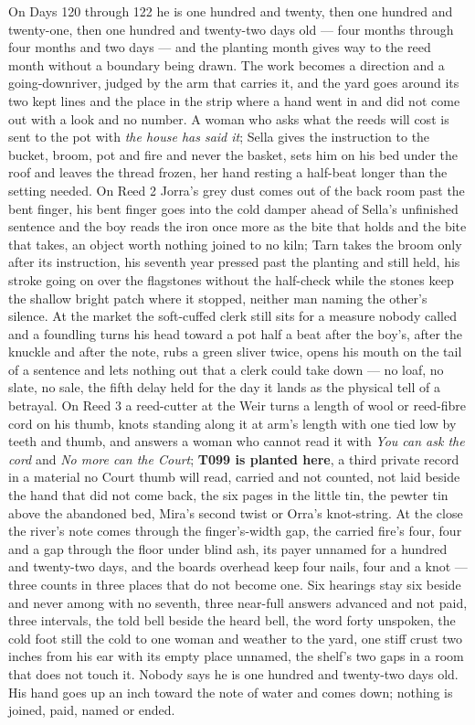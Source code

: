 \documentclass{design/chronicle}
\begin{document}
{On Days 120 through 122 he is one hundred and twenty, then one hundred and twenty-one, then one hundred and twenty-two days old — four months through four months and two days — and the planting month gives way to the reed month without a boundary being drawn. The work becomes a direction and a going-downriver, judged by the arm that carries it, and the yard goes around its two kept lines and the place in the strip where a hand went in and did not come out with a look and no number. A woman who asks what the reeds will cost is sent to the pot with \emph{the house has said it}; Sella gives the instruction to the bucket, broom, pot and fire and never the basket, sets him on his bed under the roof and leaves the thread frozen, her hand resting a half-beat longer than the setting needed. On Reed 2 Jorra’s grey dust comes out of the back room past the bent finger, his bent finger goes into the cold damper ahead of Sella’s unfinished sentence and the boy reads the iron once more as the bite that holds and the bite that takes, an object worth nothing joined to no kiln; Tarn takes the broom only after its instruction, his seventh year pressed past the planting and still held, his stroke going on over the flagstones without the half-check while the stones keep the shallow bright patch where it stopped, neither man naming the other’s silence. At the market the soft-cuffed clerk still sits for a measure nobody called and a foundling turns his head toward a pot half a beat after the boy’s, after the knuckle and after the note, rubs a green sliver twice, opens his mouth on the tail of a sentence and lets nothing out that a clerk could take down — no loaf, no slate, no sale, the fifth delay held for the day it lands as the physical tell of a betrayal. On Reed 3 a reed-cutter at the Weir turns a length of wool or reed-fibre cord on his thumb, knots standing along it at arm’s length with one tied low by teeth and thumb, and answers a woman who cannot read it with \emph{You can ask the cord} and \emph{No more can the Court}; \textbf{T099 is planted here}, a third private record in a material no Court thumb will read, carried and not counted, not laid beside the hand that did not come back, the six pages in the little tin, the pewter tin above the abandoned bed, Mira’s second twist or Orra’s knot-string. At the close the river’s note comes through the finger’s-width gap, the carried fire’s four, four and a gap through the floor under blind ash, its payer unnamed for a hundred and twenty-two days, and the boards overhead keep four nails, four and a knot — three counts in three places that do not become one. Six hearings stay six beside and never among with no seventh, three near-full answers advanced and not paid, three intervals, the told bell beside the heard bell, the word forty unspoken, the cold foot still the cold to one woman and weather to the yard, one stiff crust two inches from his ear with its empty place unnamed, the shelf’s two gaps in a room that does not touch it. Nobody says he is one hundred and twenty-two days old. His hand goes up an inch toward the note of water and comes down; nothing is joined, paid, named or ended.

}
\end{document}
